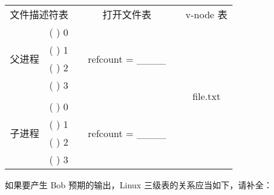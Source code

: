 \begin{problems}
\begin{table}[H]
            \begin{tabular}{cccccc}
                \multicolumn{2}{c}{文件描述符表} & {\qquad} & 打开文件表 & {\qquad} & v-node 表 \\ \cline{1-2} \cline{4-4} \cline{6-6} 
                \multicolumn{1}{|c|}{\multirow{4}{*}{父进程}} & \multicolumn{1}{c|}{(     ) 0} & \multicolumn{1}{c|}{} & \multicolumn{1}{c|}{\multirow{4}{*}{refcount = \_\_\_\_}} & \multicolumn{1}{c|}{} & \multicolumn{1}{c|}{\multirow{9}{*}{file.txt}} \\ \cline{2-2}
                \multicolumn{1}{|c|}{} & \multicolumn{1}{c|}{(     ) 1} & \multicolumn{1}{c|}{} & \multicolumn{1}{c|}{} & \multicolumn{1}{c|}{} & \multicolumn{1}{c|}{} \\ \cline{2-2}
                \multicolumn{1}{|c|}{} & \multicolumn{1}{c|}{(     ) 2} & \multicolumn{1}{c|}{} & \multicolumn{1}{c|}{} & \multicolumn{1}{c|}{} & \multicolumn{1}{c|}{} \\ \cline{2-2}
                \multicolumn{1}{|c|}{} & \multicolumn{1}{c|}{(     ) 3} & \multicolumn{1}{c|}{} & \multicolumn{1}{c|}{} & \multicolumn{1}{c|}{} & \multicolumn{1}{c|}{} \\ \cline{1-2} \cline{4-4}
                &  &  &  & \multicolumn{1}{c|}{} & \multicolumn{1}{c|}{} \\ \cline{1-2} \cline{4-4}
                \multicolumn{1}{|c|}{\multirow{4}{*}{子进程}} & \multicolumn{1}{c|}{(     ) 0} & \multicolumn{1}{c|}{} & \multicolumn{1}{c|}{\multirow{4}{*}{refcount = \_\_\_\_}} & \multicolumn{1}{c|}{} & \multicolumn{1}{c|}{} \\ \cline{2-2}
                \multicolumn{1}{|c|}{} & \multicolumn{1}{c|}{(     ) 1} & \multicolumn{1}{c|}{} & \multicolumn{1}{c|}{} & \multicolumn{1}{c|}{} & \multicolumn{1}{c|}{} \\ \cline{2-2}
                \multicolumn{1}{|c|}{} & \multicolumn{1}{c|}{(     ) 2} & \multicolumn{1}{c|}{} & \multicolumn{1}{c|}{} & \multicolumn{1}{c|}{} & \multicolumn{1}{c|}{} \\ \cline{2-2}
                \multicolumn{1}{|c|}{} & \multicolumn{1}{c|}{(     ) 3} & \multicolumn{1}{c|}{} & \multicolumn{1}{c|}{} & \multicolumn{1}{c|}{} & \multicolumn{1}{c|}{} \\ \cline{1-2} \cline{4-4} \cline{6-6} 
            \end{tabular}
        \end{table}
        \subqn 如果要产生 Bob 预期的输出，Linux 三级表的关系应当如下，请补全：
        \begin{table}[H]

\end{table}
\end{problems}
